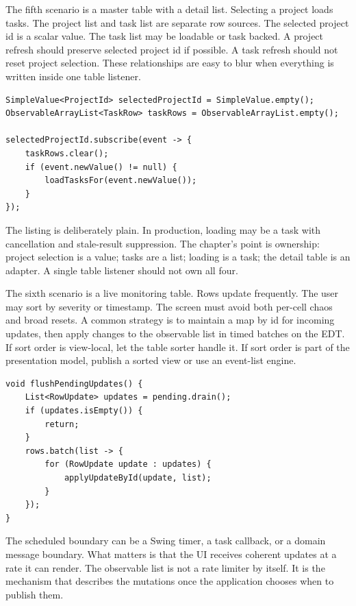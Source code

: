 The fifth scenario is a master table with a detail list. Selecting a project
loads tasks. The project list and task list are separate row sources. The
selected project id is a scalar value. The task list may be loadable or task
backed. A project refresh should preserve selected project id if possible. A
task refresh should not reset project selection. These relationships are easy to
blur when everything is written inside one table listener.

\begin{lstlisting}[caption={Master id drives a separate detail row source.}]
SimpleValue<ProjectId> selectedProjectId = SimpleValue.empty();
ObservableArrayList<TaskRow> taskRows = ObservableArrayList.empty();

selectedProjectId.subscribe(event -> {
    taskRows.clear();
    if (event.newValue() != null) {
        loadTasksFor(event.newValue());
    }
});
\end{lstlisting}

The listing is deliberately plain. In production, loading may be a task with
cancellation and stale-result suppression. The chapter's point is ownership:
project selection is a value; tasks are a list; loading is a task; the detail
table is an adapter. A single table listener should not own all four.

The sixth scenario is a live monitoring table. Rows update frequently. The user
may sort by severity or timestamp. The screen must avoid both per-cell chaos and
broad resets. A common strategy is to maintain a map by id for incoming updates,
then apply changes to the observable list in timed batches on the EDT. If sort
order is view-local, let the table sorter handle it. If sort order is part of
the presentation model, publish a sorted view or use an event-list engine.

\begin{lstlisting}[caption={Apply live updates on a scheduled presentation boundary.}]
void flushPendingUpdates() {
    List<RowUpdate> updates = pending.drain();
    if (updates.isEmpty()) {
        return;
    }
    rows.batch(list -> {
        for (RowUpdate update : updates) {
            applyUpdateById(update, list);
        }
    });
}
\end{lstlisting}

The scheduled boundary can be a Swing timer, a task callback, or a domain
message boundary. What matters is that the UI receives coherent updates at a
rate it can render. The observable list is not a rate limiter by itself. It is
the mechanism that describes the mutations once the application chooses when to
publish them.

